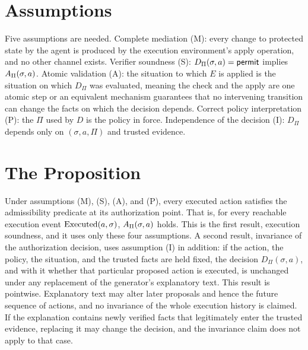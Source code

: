 \section{Assumptions}

Five assumptions are needed. Complete mediation (M): every change to protected state by the agent is produced by the execution environment's apply operation, and no other channel exists. Verifier soundness (S): $D_\Pi(\sigma,a)=\mathsf{permit}$ implies $A_\Pi(\sigma,a)$. Atomic validation (A): the situation to which $E$ is applied is the situation on which $D_\Pi$ was evaluated, meaning the check and the apply are one atomic step or an equivalent mechanism guarantees that no intervening transition can change the facts on which the decision depends. Correct policy interpretation (P): the $\Pi$ used by $D$ is the policy in force. Independence of the decision (I): $D_\Pi$ depends only on $(\sigma,a,\Pi)$ and trusted evidence.

\section{The Proposition}

\begin{proposition}\label{thm:soundness}
Under assumptions (M), (S), (A), and (P), every executed action satisfies the admissibility predicate at its authorization point. That is, for every reachable execution event $\operatorname{Executed}(a,\sigma)$, $A_\Pi(\sigma,a)$ holds. This is the first result, execution soundness, and it uses only these four assumptions. A second result, invariance of the authorization decision, uses assumption (I) in addition: if the action, the policy, the situation, and the trusted facts are held fixed, the decision $D_\Pi(\sigma,a)$, and with it whether that particular proposed action is executed, is unchanged under any replacement of the generator's explanatory text. This result is pointwise. Explanatory text may alter later proposals and hence the future sequence of actions, and no invariance of the whole execution history is claimed. If the explanation contains newly verified facts that legitimately enter the trusted evidence, replacing it may change the decision, and the invariance claim does not apply to that case.
\end{proposition}

